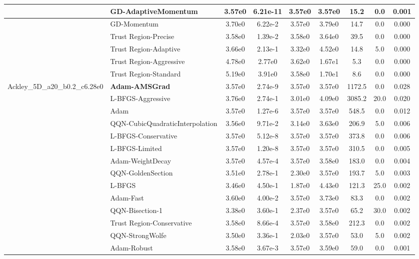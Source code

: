 \documentclass[10pt]{article}
\begin{document}
\begin{longtable}{|l|l|c|c|c|c|c|c|c|}
\hline
 & GD-AdaptiveMomentum & 3.57e0 & 6.21e-11 & 3.57e0 & 3.57e0 & 15.2 & 0.0 & 0.001 \\
\hline
 & GD-Momentum & 3.70e0 & 6.22e-2 & 3.57e0 & 3.79e0 & 14.7 & 0.0 & 0.000 \\
\hline
 & Trust Region-Precise & 3.58e0 & 1.39e-2 & 3.58e0 & 3.64e0 & 39.5 & 0.0 & 0.000 \\
\hline
 & Trust Region-Adaptive & 3.66e0 & 2.13e-1 & 3.32e0 & 4.52e0 & 14.8 & 5.0 & 0.000 \\
\hline
 & Trust Region-Aggressive & 4.78e0 & 2.77e0 & 3.62e0 & 1.67e1 & 5.3 & 0.0 & 0.000 \\
\hline
 & Trust Region-Standard & 5.19e0 & 3.91e0 & 3.58e0 & 1.70e1 & 8.6 & 0.0 & 0.000 \\
Ackley\_5D\_a20\_b0.2\_c6.28e0 & \textbf{Adam-AMSGrad} & 3.57e0 & 2.74e-9 & 3.57e0 & 3.57e0 & 1172.5 & 0.0 & 0.028 \\
\hline
 & L-BFGS-Aggressive & 3.76e0 & 2.74e-1 & 3.01e0 & 4.09e0 & 3085.2 & 20.0 & 0.020 \\
\hline
 & Adam & 3.57e0 & 1.27e-6 & 3.57e0 & 3.57e0 & 548.5 & 0.0 & 0.012 \\
\hline
 & QQN-CubicQuadraticInterpolation & 3.56e0 & 9.71e-2 & 3.14e0 & 3.63e0 & 206.9 & 5.0 & 0.006 \\
\hline
 & L-BFGS-Conservative & 3.57e0 & 5.12e-8 & 3.57e0 & 3.57e0 & 373.8 & 0.0 & 0.006 \\
\hline
 & L-BFGS-Limited & 3.57e0 & 1.20e-8 & 3.57e0 & 3.57e0 & 310.5 & 0.0 & 0.005 \\
\hline
 & Adam-WeightDecay & 3.57e0 & 4.57e-4 & 3.57e0 & 3.58e0 & 183.0 & 0.0 & 0.004 \\
\hline
 & QQN-GoldenSection & 3.51e0 & 2.78e-1 & 2.30e0 & 3.57e0 & 193.7 & 5.0 & 0.003 \\
\hline
 & L-BFGS & 3.46e0 & 4.50e-1 & 1.87e0 & 4.43e0 & 121.3 & 25.0 & 0.002 \\
\hline
 & Adam-Fast & 3.60e0 & 4.00e-2 & 3.57e0 & 3.73e0 & 83.3 & 0.0 & 0.002 \\
\hline
 & QQN-Bisection-1 & 3.38e0 & 3.60e-1 & 2.37e0 & 3.57e0 & 65.2 & 30.0 & 0.002 \\
\hline
 & Trust Region-Conservative & 3.58e0 & 8.66e-4 & 3.57e0 & 3.58e0 & 212.3 & 0.0 & 0.002 \\
\hline
 & QQN-StrongWolfe & 3.50e0 & 3.36e-1 & 2.03e0 & 3.57e0 & 53.0 & 5.0 & 0.002 \\
\hline
 & Adam-Robust & 3.58e0 & 3.67e-3 & 3.57e0 & 3.59e0 & 59.0 & 0.0 & 0.001 \\

\end{longtable}
\end{document}
